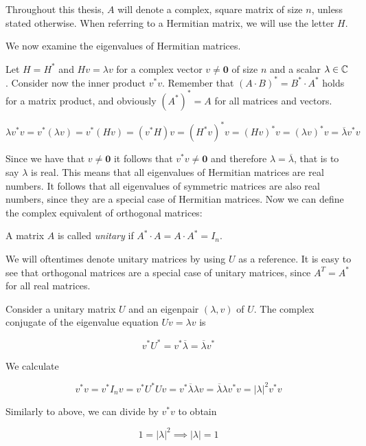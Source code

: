 Throughout this thesis, $A$ will denote a complex, square matrix of size $n$, unless stated otherwise. When referring to a Hermitian matrix, we will use the letter $H$.

We now examine the eigenvalues of Hermitian matrices.

Let $H = H^*$ and $H v = \lambda v$ for a complex vector $v \neq \mathbf{0}$ of size $n$ and a scalar $\lambda \in \mathbb{C}$. Consider now the inner product $ v^* v$. Remember that $(A \cdot B)^* = B^* \cdot A^*$ holds for a matrix product, and obviously ${(A^*)^*} = A$ for all matrices and vectors.

\[
    \lambda v^* v = v^* \left( \lambda v \right)
    = v^* \left( H v \right)
    = \left(v^* H \right) v
    = \left( H^* v \right)^* v
    = \left( H v \right)^* v
    = (\lambda v)^* v
    = \overline{\lambda} v^* v
\]

Since we have that $v \neq \mathbf{0}$ it follows that $v^* v \neq \mathbf{0}$ and therefore $\lambda = \overline{\lambda}$, that is to say $\lambda$ is real. This means that all eigenvalues of Hermitian matrices are real numbers. It follows that all eigenvalues of symmetric matrices are also real numbers, since they are a special case of Hermitian matrices. Now we can define the complex equivalent of orthogonal matrices:

\begin{definition}
    A matrix $A$ is called \emph{unitary} if $A^* \cdot A = A \cdot A^* = I_n$.
\end{definition}

We will oftentimes denote unitary matrices by using $U$ as a reference. It is easy to see that orthogonal matrices are a special case of unitary matrices, since $A^T = A^*$ for all real matrices.

Consider a unitary matrix $U$ and an eigenpair $(\lambda, v)$ of $U$. The complex conjugate of the eigenvalue equation $U v = \lambda v$ is

\[
    v^* U^* = v^* \overline{\lambda} = \overline{\lambda} v^*
\]

We calculate

\[
    v^* v = v^* I_n v = v^* U^* U v = v^* \overline{\lambda} \lambda v = \overline{\lambda} \lambda v^* v = \left| \lambda \right|^2 v^* v
\]

Similarly to above, we can divide by $v^* v$ to obtain

\[
    1 = \left| \lambda \right|^2 \implies \left| \lambda \right| = 1
\]


